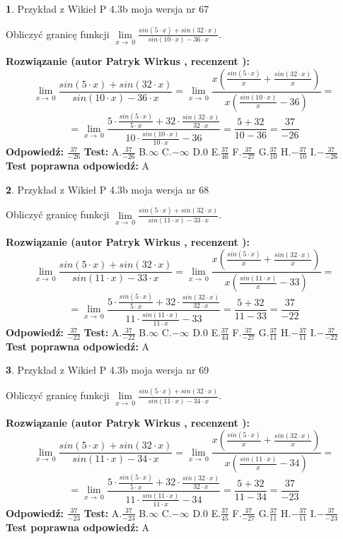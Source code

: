 \documentclass[12pt, a4paper]{article}
\theoremstyle{definition} %
\newtheorem{zad}{}
\newcommand{\zadStart}[1]{\begin{zad}#1\newline}
\newcommand{\zadStop}{\end{zad}}
\newcommand{\rozwStart}[2]{\noindent \textbf{Rozwiązanie (autor #1 , recenzent #2): }\newline}
\newcommand{\rozwStop}{\newline}
\newcommand{\odpStart}{\noindent \textbf{Odpowiedź:}\newline}
\newcommand{\odpStop}{\newline}
\newcommand{\testStart}{\noindent \textbf{Test:}\newline}
\newcommand{\testStop}{\newline}
\newcommand{\kluczStart}{\noindent \textbf{Test poprawna odpowiedź:}\newline}
\newcommand{\kluczStop}{\newline}
\begin{document}
\zadStart{Przykład z Wikieł P 4.3b moja wersja nr 67}


Obliczyć granicę funkcji $\lim\limits_{x\to\ 0}\frac{sin(5 \cdot x)+sin(32 \cdot x)}{sin(10 \cdot x)-36 \cdot x}$.
\zadStop
\rozwStart{Patryk Wirkus}{}
$$\lim\limits_{x\to\ 0}\frac{sin(5 \cdot x)+sin(32 \cdot x)}{sin(10 \cdot x)-36 \cdot x}=\lim\limits_{x\to\ 0}\frac{x(\frac{sin(5 \cdot x)}{x}+\frac{sin(32 \cdot x)}{x})}{x(\frac{sin(10 \cdot x)}{x}-36)}=$$
$$=\lim\limits_{x\to\ 0}\frac{5 \cdot \frac{sin(5 \cdot x)}{5 \cdot x}+32 \cdot \frac{sin(32 \cdot x)}{32 \cdot x}}{10 \cdot \frac{sin(10 \cdot x)}{10 \cdot x}-36}=\frac{5+32}{10-36} = \frac{37}{-26}$$
\rozwStop
\odpStart
$\frac{37}{-26}$
\odpStop
\testStart
A.$\frac{37}{-26}$
B.$\infty$
C.$-\infty$
D.$0$
E.$\frac{37}{46}$
F.$\frac{37}{-27}$
G.$\frac{37}{10}$
H.$-\frac{37}{10}$
I.$-\frac{37}{-26}$
\testStop
\kluczStart
A
\kluczStop



\zadStart{Przykład z Wikieł P 4.3b moja wersja nr 68}


Obliczyć granicę funkcji $\lim\limits_{x\to\ 0}\frac{sin(5 \cdot x)+sin(32 \cdot x)}{sin(11 \cdot x)-33 \cdot x}$.
\zadStop
\rozwStart{Patryk Wirkus}{}
$$\lim\limits_{x\to\ 0}\frac{sin(5 \cdot x)+sin(32 \cdot x)}{sin(11 \cdot x)-33 \cdot x}=\lim\limits_{x\to\ 0}\frac{x(\frac{sin(5 \cdot x)}{x}+\frac{sin(32 \cdot x)}{x})}{x(\frac{sin(11 \cdot x)}{x}-33)}=$$
$$=\lim\limits_{x\to\ 0}\frac{5 \cdot \frac{sin(5 \cdot x)}{5 \cdot x}+32 \cdot \frac{sin(32 \cdot x)}{32 \cdot x}}{11 \cdot \frac{sin(11 \cdot x)}{11 \cdot x}-33}=\frac{5+32}{11-33} = \frac{37}{-22}$$
\rozwStop
\odpStart
$\frac{37}{-22}$
\odpStop
\testStart
A.$\frac{37}{-22}$
B.$\infty$
C.$-\infty$
D.$0$
E.$\frac{37}{44}$
F.$\frac{37}{-27}$
G.$\frac{37}{11}$
H.$-\frac{37}{11}$
I.$-\frac{37}{-22}$
\testStop
\kluczStart
A
\kluczStop



\zadStart{Przykład z Wikieł P 4.3b moja wersja nr 69}


Obliczyć granicę funkcji $\lim\limits_{x\to\ 0}\frac{sin(5 \cdot x)+sin(32 \cdot x)}{sin(11 \cdot x)-34 \cdot x}$.
\zadStop
\rozwStart{Patryk Wirkus}{}
$$\lim\limits_{x\to\ 0}\frac{sin(5 \cdot x)+sin(32 \cdot x)}{sin(11 \cdot x)-34 \cdot x}=\lim\limits_{x\to\ 0}\frac{x(\frac{sin(5 \cdot x)}{x}+\frac{sin(32 \cdot x)}{x})}{x(\frac{sin(11 \cdot x)}{x}-34)}=$$
$$=\lim\limits_{x\to\ 0}\frac{5 \cdot \frac{sin(5 \cdot x)}{5 \cdot x}+32 \cdot \frac{sin(32 \cdot x)}{32 \cdot x}}{11 \cdot \frac{sin(11 \cdot x)}{11 \cdot x}-34}=\frac{5+32}{11-34} = \frac{37}{-23}$$
\rozwStop
\odpStart
$\frac{37}{-23}$
\odpStop
\testStart
A.$\frac{37}{-23}$
B.$\infty$
C.$-\infty$
D.$0$
E.$\frac{37}{45}$
F.$\frac{37}{-27}$
G.$\frac{37}{11}$
H.$-\frac{37}{11}$
I.$-\frac{37}{-23}$
\testStop
\kluczStart
A
\kluczStop
\end{document}
